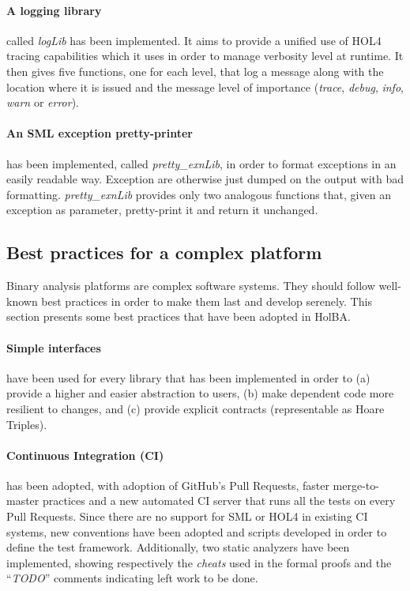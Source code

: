 \documentclass[10pt,a4paper]{article}
\begin{document}
\begin{multicols}{2}
\paragraph{A logging library} called \textit{logLib} has been implemented. It aims to provide a unified use of HOL4 tracing capabilities which it uses in order to manage verbosity level at runtime. It then gives five functions, one for each level, that log a message along with the location where it is issued and the message level of importance (\textit{trace}, \textit{debug}, \textit{info}, \textit{warn} or \textit{error}).

\paragraph{An SML exception pretty-printer} has been implemented, called \textit{pretty\_exnLib}, in order to format exceptions in an easily readable way. Exception are otherwise just dumped on the output with bad formatting. \textit{pretty\_exnLib} provides only two analogous functions that, given an exception as parameter, pretty-print it and return it unchanged.

\subsection{Best practices for a complex platform} \label{best-practices-complex-platform}

Binary analysis platforms are complex software systems. They should follow well-known best practices in order to make them last and develop serenely. This section presents some best practices that have been adopted in HolBA.

\paragraph{Simple interfaces} have been used for every library that has been implemented in order to (a) provide a higher and easier abstraction to users, (b) make dependent code more resilient to changes, and (c) provide explicit contracts (representable as Hoare Triples).

\paragraph{Continuous Integration (CI)} has been adopted, with adoption of GitHub's Pull Requests, faster merge-to-master practices and a new automated CI server that runs all the tests on every Pull Requests. Since there are no support for SML or HOL4 in existing CI systems, new conventions have been adopted and scripts developed in order to define the test framework. Additionally, two static analyzers have been implemented, showing respectively the \textit{cheats} used in the formal proofs and the ``\textit{TODO}'' comments indicating left work to be done.


\end{multicols}
\end{document}
